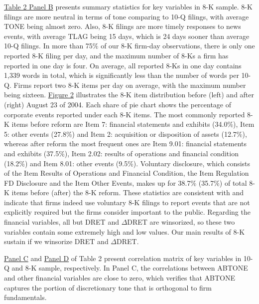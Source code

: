 \documentclass[a4paper]{article}
\begin{document}
\begin{spacing}{2}
\hyperref[T2PB]{Table 2 Panel B} presents summary statistics for key variables in 8-K sample. 8-K filings are more neutral in terms of tone comparing to 10-Q filings, with average TONE being almost zero. Also, 8-K filings are more timely responses to news events, with average TLAG being 15 days, which is 24 days sooner than average 10-Q filings. In more than 75\% of our 8-K firm-day observations, there is only one reported 8-K filing per day, and the maximum number of 8-Ks a firm has reported in one day is four. On average, all reported 8-Ks in one day contains 1,339 words in total, which is significantly less than the number of words per 10-Q. Firms report two 8-K items per day on average, with the maximum number being sixteen. \hyperref[fig2]{Figure 2} illustrates the 8-K item distribution before (left) and after (right) August 23 of 2004. Each share of pie chart shows the percentage of corporate events reported under each 8-K items. The most commonly reported 8-K items before reform are Item 7: financial statements and exhibits (34.0\%), Item 5: other events (27.8\%) and Item 2: acquisition or disposition of assets (12.7\%), whereas after reform the most frequent ones are Item 9.01: financial statements and exhibits (37.5\%), Item 2.02: results of operations and financial condition (18.2\%) and Item 8.01: other events (9.5\%). Voluntary disclosure, which consists of the Item Results of Operations and Financial Condition, the Item Regulation FD Disclosure and the Item Other Events, makes up for 38.7\% (35.7\%) of total 8-K items before (after) the 8-K reform. These statistics are consistent with  and indicate that firms indeed use voluntary 8-K filings to report events that are not explicitly required but the firms consider important to the public. Regarding the financial variables, all but DRET and $\Delta$DRET are winsorized, so these two variables contain some extremely high and low values. Our main results of 8-K sustain if we winsorize DRET and $\Delta$DRET.

\hyperref[T2PC]{Panel C} and \hyperref[T2PD]{Panel D} of Table 2 present correlation matrix of key variables in 10-Q and 8-K sample, respectively. In Panel C, the correlations between ABTONE and other financial variables are close to zero, which verifies that ABTONE captures the portion of discretionary tone that is orthogonal to firm fundamentals. 


\end{spacing}
\end{document}
